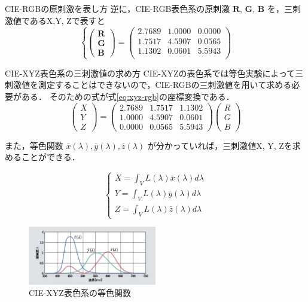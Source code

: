 \documentclass[8pt, jfont=ipaexm, t]{beamer} %
\begin{document}
\begin{frame}{CIE-RGBの原刺激を表し方}
 逆に，CIE-RGB表色系の原刺激 \(\textbf{R, G, B}\) を，三刺激値であるX,Y, Zで表すと
\begin{equation}
\left\{
\begin{pmatrix}
\textbf{R} \\
\textbf{G} \\
\textbf{B}
\end{pmatrix}
= 
\begin{pmatrix}
2.7689 & 1.0000 & 0.0000 \\
1.7517 & 4.5907 & 0.0565 \\
1.1302 & 0.0601 & 5.5943 \\
\end{pmatrix}
\right.
\end{equation}
\end{frame}
\begin{frame}[allowframebreaks,  c]{CIE-XYZ表色系の三刺激値の求め方}
CIE-XYZの表色系では等色実験によって三刺激値を測定することはできないので，CIE-RGBの三刺激値を用いて求める必要がある．
そのための式が式\eqref{eq:xyz-rgb}の座標変換である．
\begin{equation}\label{eq:xyz-rgb}
\begin{pmatrix}
X \\
Y \\
Z
\end{pmatrix}
= 
\begin{pmatrix}
2.7689 & 1.7517 & 1.1302 \\
1.0000 & 4.5907 & 0.0601 \\
0.0000 & 0.0565 & 5.5943 
\end{pmatrix}
\begin{pmatrix}
R \\
G \\
B
\end{pmatrix}
\end{equation}
\newpage

また，等色関数 \(\bar{x}(\lambda), \bar{y}(\lambda), \bar{z}(\lambda)\)
が分かっていれば，三刺激値X, Y, Zを求めることができる． 

\begin{equation}
\left\{
\begin{aligned}
X = \int_V L(\lambda)\bar{x}(\lambda)d\lambda \\
Y = \int_V L(\lambda)\bar{y}(\lambda)d\lambda \\
Z = \int_V L(\lambda)\bar{z}(\lambda)d\lambda
\end{aligned}
\right.
\end{equation}
\begin{figure}
  \centering
  \includegraphics[width=0.5\textwidth]{./figure/029.png}
  \caption{CIE-XYZ表色系の等色関数}
  \label{fig:cie-xyz}
\end{figure}
\end{frame}
\end{document}
